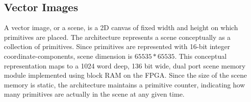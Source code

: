 \subsection{Vector Images}

A vector image, or a scene, is a 2D canvas of fixed width and height on which primitives are placed.
The \vthreek architecture represents a scene conceptually as a collection of primitives.
Since primitives are represented with 16-bit integer coordinate-components, scene dimension is $65535 * 65535$.
This conceptual representation maps to a 1024 word deep, 136 bit wide, dual port scene memory module implemented using block RAM \cite{xilinx-block-ram} on the FPGA.
Since the size of the scene memory is static, the architecture maintains a primitive counter, indicating how many primitives are actually in the scene at any given time.

